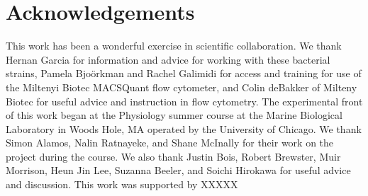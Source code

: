 \section*{Acknowledgements }

This work has been a wonderful exercise in scientific collaboration. We thank
Hernan Garcia for information and advice for working with these bacterial
strains, Pamela Bjo\"{o}rkman and Rachel Galimidi for access and training for
use of the Miltenyi Biotec MACSQuant flow cytometer, and Colin deBakker of
Milteny Biotec for useful advice and instruction in flow cytometry. The
experimental front of this work began at the Physiology summer course at the
Marine Biological Laboratory in Woods Hole, MA operated by the University of
Chicago. We thank Simon Alamos, Nalin Ratnayeke, and Shane McInally for their
work on the project during the course. We also thank Justin Bois, Robert
Brewster, Muir Morrison, Heun Jin Lee, Suzanna Beeler, and Soichi Hirokawa for
useful advice and discussion. This work was supported by XXXXX

